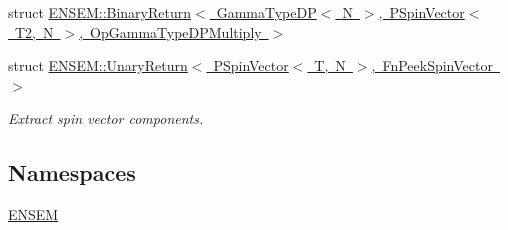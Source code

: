 \begin{DoxyCompactItemize}
\item 
struct \mbox{\hyperlink{structENSEM_1_1BinaryReturn_3_01GammaTypeDP_3_01N_01_4_00_01PSpinVector_3_01T2_00_01N_01_4_00_01OpGammaTypeDPMultiply_01_4}{E\+N\+S\+E\+M\+::\+Binary\+Return$<$ Gamma\+Type\+D\+P$<$ N $>$, P\+Spin\+Vector$<$ T2, N $>$, Op\+Gamma\+Type\+D\+P\+Multiply $>$}}
\item 
struct \mbox{\hyperlink{structENSEM_1_1UnaryReturn_3_01PSpinVector_3_01T_00_01N_01_4_00_01FnPeekSpinVector_01_4}{E\+N\+S\+E\+M\+::\+Unary\+Return$<$ P\+Spin\+Vector$<$ T, N $>$, Fn\+Peek\+Spin\+Vector $>$}}
\begin{DoxyCompactList}\small\item\em Extract spin vector components. \end{DoxyCompactList}\end{DoxyCompactItemize}
\subsection*{Namespaces}
\begin{DoxyCompactItemize}
\item 
 \mbox{\hyperlink{namespaceENSEM}{E\+N\+S\+EM}}
\end{DoxyCompactItemize}
